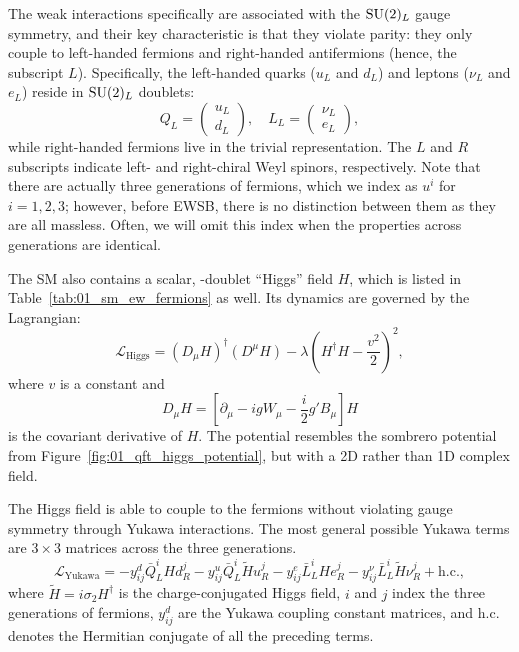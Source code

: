 The weak interactions specifically are associated with the $\SU[2]_L$ gauge symmetry, and their key characteristic is that they violate parity: they only couple to left-handed fermions and right-handed antifermions (hence, the subscript $L$).
Specifically, the left-handed quarks ($u_L$ and $d_L$) and leptons ($\nu_L$ and $e_L$) reside in $\SU[2]_L$ doublets:
\begin{equation}
	\label{eq:01_sm_ew_doublets}
	Q_L = \begin{pmatrix} u_L \\ d_L \end{pmatrix}, \quad L_L = \begin{pmatrix} \nu_L \\ e_L \end{pmatrix},
\end{equation}
while right-handed fermions live in the trivial representation.
The $L$ and $R$ subscripts indicate left- and right-chiral Weyl spinors, respectively.
Note that there are actually three generations of fermions, which we index as $u^i$ for $i = 1, 2, 3$; however, before EWSB, there is no distinction between them as they are all massless.
Often, we will omit this index when the properties across generations are identical.

The SM also contains a scalar, \SU[2]-doublet ``Higgs'' field $H$, which is listed in Table~\ref{tab:01_sm_ew_fermions} as well.
Its dynamics are governed by the Lagrangian:
\begin{equation}
	\label{eq:01_sm_ew_higgs_lagrangian}
	\mathcal{L}_\mathrm{Higgs} = (D_\mu H)^\dagger (D^\mu H) - \lambda (H^\dagger H - \frac{v^2}{2})^2,
\end{equation}
where $v$ is a constant and
\begin{equation}
	\label{eq:01_sm_ew_higgs_derivative}
	D_\mu H = \left[\partial_\mu - igW_\mu - \frac{i}{2} g' B_\mu\right]H
\end{equation}
is the covariant derivative of $H$.
The potential resembles the sombrero potential from Figure~\ref{fig:01_qft_higgs_potential}, but with a 2D rather than 1D complex field.

The Higgs field is able to couple to the fermions without violating gauge symmetry through Yukawa interactions.
The most general possible Yukawa terms are $3 \times 3$ matrices across the three generations.
\begin{equation}
	\label{eq:01_sm_ew_yukawa}
	\mathcal{L}_\mathrm{Yukawa} = -y^d_{ij} \bar{Q}^i_L H d^j_R - y^u_{ij} \bar{Q}^i_L \tilde H u^j_R - y^e_{ij} \bar{L}^i_L H e^j_R - y^\nu_{ij} \bar{L}^i_L \tilde H \nu^j_R + \text{h.c.},
\end{equation}
where $\tilde H = i\sigma_2 H^\dagger$ is the charge-conjugated Higgs field, $i$ and $j$ index the three generations of fermions, $y^d_{ij}$ are the Yukawa coupling constant matrices, and h.c. denotes the Hermitian conjugate of all the preceding terms.

